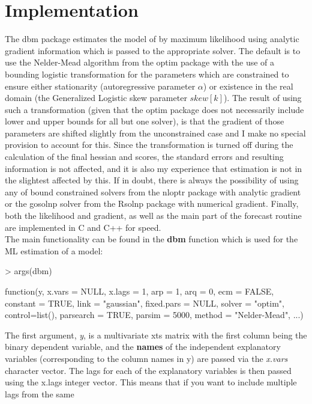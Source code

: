 \section{Implementation}\label{sec:implementation}
The dbm package estimates the model of \cite{Kauppi2008} by maximum likelihood using analytic gradient information which is passed to the appropriate solver.
The default is to use the Nelder-Mead algorithm from the optim package with the use of a bounding logistic transformation for the parameters which are constrained
to ensure either stationarity (autoregressive parameter $\alpha$) or existence in the real domain (the Generalized Logistic skew parameter
$skew[k]$).
The result of using such a transformation (given that the optim package does not necessarily include lower and upper bounds for all but one solver), is that the gradient of
those parameters are shifted slightly from the unconstrained case and I make no special provision to account for this. Since the transformation is turned off
during the calculation of the final hessian and scores, the standard errors and resulting information is not affected, and it is also my experience that
estimation is not in the slightest affected by this. If in doubt, there is always the possibility of using any of bound constrained solvers from the nloptr package
with analytic gradient or the gosolnp solver from the Rsolnp package with numerical gradient. Finally, both the likelihood and gradient, as well as the 
main part of the forecast routine are implemented in C and C++ for speed.\\
The main functionality can be found in the \textbf{dbm} function which is used for the ML estimation of a model:
\begin{Schunk}
\begin{Sinput}
> args(dbm)
\end{Sinput}
\begin{Soutput}
function(y, x.vars = NULL, x.lags = 1, arp = 1, arq = 0, ecm = FALSE,
	constant = TRUE, link = "gaussian", fixed.pars = NULL,
	solver = "optim", control=list(), parsearch = TRUE, parsim = 5000,
	method = "Nelder-Mead", ...)
\end{Soutput}
\end{Schunk}
The first argument, \emph{y}, is a multivariate xts matrix with the first column being the binary dependent variable, and the \textbf{names} of the
independent explanatory variables (corresponding to the column names in y) are passed via the \emph{x.vars} character vector. The lags for each
of the explanatory variables is then passed using the x.lags integer vector. This means that if you want to include multiple lags from the same

